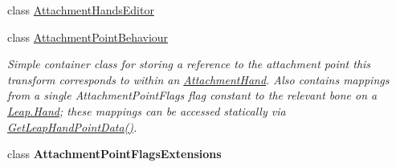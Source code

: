\begin{DoxyCompactItemize}
class \mbox{\hyperlink{class_leap_1_1_unity_1_1_attachments_1_1_attachment_hands_editor}{Attachment\+Hands\+Editor}}
\item 
class \mbox{\hyperlink{class_leap_1_1_unity_1_1_attachments_1_1_attachment_point_behaviour}{Attachment\+Point\+Behaviour}}
\begin{DoxyCompactList}\small\item\em Simple container class for storing a reference to the attachment point this transform corresponds to within an \mbox{\hyperlink{class_leap_1_1_unity_1_1_attachments_1_1_attachment_hand}{Attachment\+Hand}}. Also contains mappings from a single Attachment\+Point\+Flags flag constant to the relevant bone on a \mbox{\hyperlink{class_leap_1_1_hand}{Leap.\+Hand}}; these mappings can be accessed statically via \mbox{\hyperlink{class_leap_1_1_unity_1_1_attachments_1_1_attachment_point_behaviour_a80f3e3a2fa250a6b955a50f471b4a498}{Get\+Leap\+Hand\+Point\+Data()}}. \end{DoxyCompactList}\item 
class {\bfseries Attachment\+Point\+Flags\+Extensions}
\end{DoxyCompactItemize}
